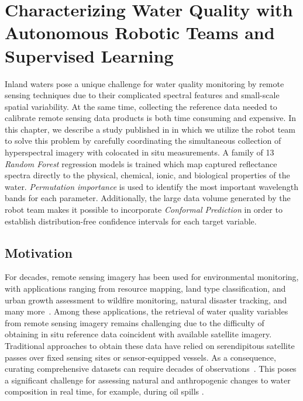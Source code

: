 \chapter{Characterizing Water Quality with Autonomous Robotic Teams and Supervised Learning}\label{ch:robot-team-supervised}




Inland waters pose a unique challenge for water quality monitoring by remote
sensing techniques due to their complicated spectral features and
small-scale spatial variability. At the same time, collecting the reference data
needed to calibrate remote sensing data products is both time consuming and
expensive. In this chapter, we describe a study published in \cite{robot-team-2}
in which we utilize the robot team to solve this problem
by carefully coordinating the simultaneous collection of hyperspectral imagery
with colocated in situ measurements. A family of 13 \textit{Random Forest}
regression models is trained which map captured reflectance spectra directly to
the physical, chemical, ionic, and biological properties of the water.
\textit{Permutation importance} is used to identify the most important
wavelength bands for each parameter. Additionally, the large data volume
generated by the robot team makes it possible to incorporate \textit{Conformal
  Prediction} in order to establish distribution-free confidence intervals for
each target variable.


\section{Motivation}

For decades, remote sensing imagery has been used for environmental monitoring,
with applications ranging from resource mapping, land type classification, and
urban growth assessment to wildfire monitoring, natural disaster tracking, and
many more~\cite{melesse2007remote, joyce2009review}. Among these applications,
the retrieval of water quality variables from remote sensing imagery remains
challenging due to the difficulty of obtaining in situ reference data coincident
with available satellite imagery. Traditional approaches to obtain these data
have relied on serendipitous satellite passes over fixed sensing sites or
sensor-equipped vessels. As a consequence, curating comprehensive datasets can
require decades of observations~\cite{aurin2018remote, ross2019aquasat}. This
poses a significant challenge for assessing natural and anthropogenic changes to
water composition in real time, for example, during oil spills
\cite{fingas2017review}.


